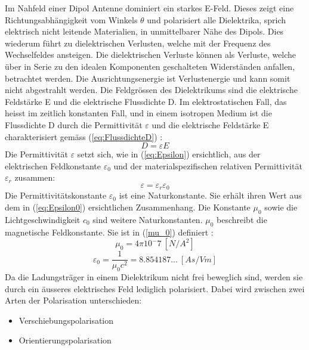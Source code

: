 
Im Nahfeld einer Dipol Antenne dominiert ein starkes E-Feld. Dieses zeigt eine Richtungsabhängigkeit vom Winkels $\theta$ und polarisiert alle Dielektrika, sprich elektrisch nicht leitende Materialien, in unmittelbarer Nähe des Dipols. Dies wiederum führt zu dielektrischen Verlusten, welche mit der Frequenz des Wechselfeldes ansteigen. Die dielektrischen Verluste können als Verluste, welche über in Serie zu den idealen Komponenten geschalteten Widerständen anfallen, betrachtet werden. Die Ausrichtungsenergie ist Verlustenergie und kann somit nicht abgestrahlt werden. Die Feldgrössen des Dielektrikums sind die elektrische Feldstärke E und die elektrische Flussdichte D. Im elektrostatischen Fall, das heisst im zeitlich konstanten Fall, und in einem isotropen Medium ist die Flussdichte D durch die Permittivität $\varepsilon $ und die elektrische Feldstärke E charakterisiert gemäss (\ref{eq:FlussdichteD}) \cite{Emant}:
\begin{equation}\label{eq:FlussdichteD}
D=\varepsilon E
\end{equation}
Die Permittivität $\varepsilon$ setzt sich, wie in (\ref{eq:Epsilon}) ersichtlich, aus der elektrischen Feldkonstante $\varepsilon_0$ und der materialspezifischen relativen Permittivität $\varepsilon_r$ zusammen:
\begin{equation}\label{eq:Epsilon}
\varepsilon = \varepsilon_r \varepsilon_0
\end{equation}
Die Permittivitätskonstante $\varepsilon_{0}$ ist eine Naturkonstante. Sie erhält ihren Wert aus dem in (\ref{eq:Epsilon0}) ersichtlichen Zusammenhang. Die Konstante $\mu_{0}$ sowie die Lichtgeschwindigkeit $c_0$ sind weitere  Naturkonstanten. $\mu_{0}$ beschreibt die magnetische Feldkonstante. Sie ist in (\ref{mu_0}) definiert \cite {WikiPermitt}: 
\begin{equation}\label{mu_0}
\mu_{0}=4\pi10^-7  \ [N/A^{2}] 
\end{equation}
\begin{equation}\label{eq:Epsilon0}
\varepsilon_{0} = \dfrac{1}{\mu_{0}c^{2}}=8.854187... \  [As/Vm]
\end{equation}
Da die Ladungsträger in einem Dielektrikum nicht frei beweglich sind, werden sie durch ein äusseres elektrisches Feld lediglich polarisiert. Dabei wird zwischen zwei Arten der Polarisation unterschieden:
\begin{itemize}
\item Verschiebungspolarisation
\item Orientierungspolarisation
\end{itemize}
